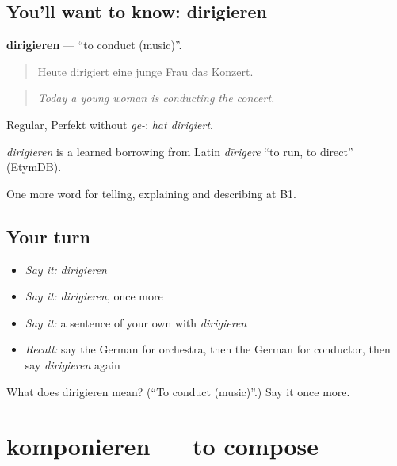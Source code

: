 \subsection*{You'll want to know: dirigieren}
\textbf{dirigieren} — \textquotedblleft{}to conduct (music)\textquotedblright{}.

\begin{quote}
Heute dirigiert eine junge Frau das Konzert.
\end{quote}

\begin{quote}
\emph{Today a young woman is conducting the concert.}
\end{quote}

Regular, Perfekt without \emph{ge-}: \emph{hat dirigiert}.

\begin{cousinweb}
\emph{dirigieren} is a learned borrowing from Latin \emph{dīrigere} \textquotedblleft{}to run, to direct\textquotedblright{} (EtymDB).
\end{cousinweb}

\begin{grammarlens}[title={What you've built}]
One more word for telling, explaining and describing at B1.
\end{grammarlens}

\subsection*{Your turn}
\begin{itemize}
\raggedright
  \item \emph{Say it:} \emph{dirigieren}
  \item \emph{Say it:} \emph{dirigieren}, once more
  \item \emph{Say it:} a sentence of your own with \emph{dirigieren}
  \item \emph{Recall:} say the German for orchestra, then the German for conductor, then say \emph{dirigieren} again
\end{itemize}

\begin{tcolorbox}[breakable,colback=teal!4,colframe=teal!35!black,title={Before you move on}]
What does dirigieren mean? (\textquotedblleft{}To conduct (music)\textquotedblright{}.) Say it once more.
\end{tcolorbox}
\section[komponieren]{komponieren — to compose}

